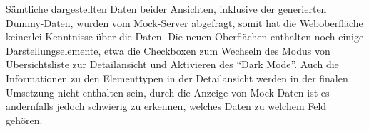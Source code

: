 \clearpage{}

Sämtliche dargestellten Daten beider Ansichten, inklusive der generierten Dummy-Daten, wurden vom Mock-Server abgefragt, somit hat die Weboberfläche keinerlei Kenntnisse über die Daten. Die neuen Oberflächen enthalten noch einige Darstellungselemente, etwa die Checkboxen zum Wechseln des Modus von Übersichtsliste zur Detailansicht und Aktivieren des \enquote{Dark Mode}. Auch die Informationen zu den Elementtypen in der Detailansicht werden in der finalen Umsetzung nicht enthalten sein, durch die Anzeige von Mock-Daten ist es andernfalls jedoch schwierig zu erkennen, welches Daten zu welchem Feld gehören.
